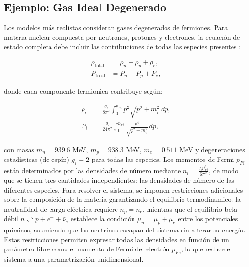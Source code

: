 \subsection{Ejemplo: Gas Ideal Degenerado}
\label{sec:gasnpe}

Los modelos más realistas consideran gases degenerados de fermiones. Para materia nuclear compuesta por neutrones, protones y electrones, la ecuación de estado completa debe incluir las contribuciones de todas las especies presentes \cite{shapiroBlackHolesWhite2008}:

\begin{align}
	\rho_{\text{total}} &= \rho_n + \rho_p + \rho_e, \label{eq:densidad_total} \\
	P_{\text{total}} &= P_n + P_p + P_e, \label{eq:presion_total}
\end{align}

donde cada componente fermionica contribuye según:

\begin{align}
	\rho_i &= \frac{g_i}{8\pi^2} \int_0^{p_{Fi}} p^2\sqrt{p^2 + m_i^2} \, dp, \label{eq:densidad_fermi_general} \\
	P_i &= \frac{g_i}{24\pi^2} \int_0^{p_{Fi}} \frac{p^4}{\sqrt{p^2 + m_i^2}} \, dp, \label{eq:presion_fermi_general}
\end{align}

con masas $m_n = 939.6$ MeV, $m_p = 938.3$ MeV, $m_e = 0.511$ MeV y degeneraciones estadísticas (de espín) $g_i = 2$ para todas las especies. Los momentos de Fermi $p_{Fi}$ están determinados por las densidades de número mediante $n_i = \frac{g_i p_{Fi}^3}{6\pi^2}$, de modo que se tienen tres cantidades independientes: las densidades de número de las diferentes especies. Para resolver el sistema, se imponen restricciones adicionales sobre la composición de la materia garantizando el equilibrio termodinámico: la neutralidad de carga eléctrica requiere $n_p = n_e$, mientras que el equilibrio beta débil $n \rightleftharpoons p + e^- + \bar{\nu}_e$ establece la condición $\mu_n = \mu_p + \mu_e$ entre los potenciales químicos, asumiendo que los neutrinos escapan del sistema sin alterar su energía. Estas restricciones permiten expresar todas las densidades en función de un parámetro libre como el momento de Fermi del electrón $p_{Fe}$, lo que reduce el sistema a una parametrización unidimensional.

